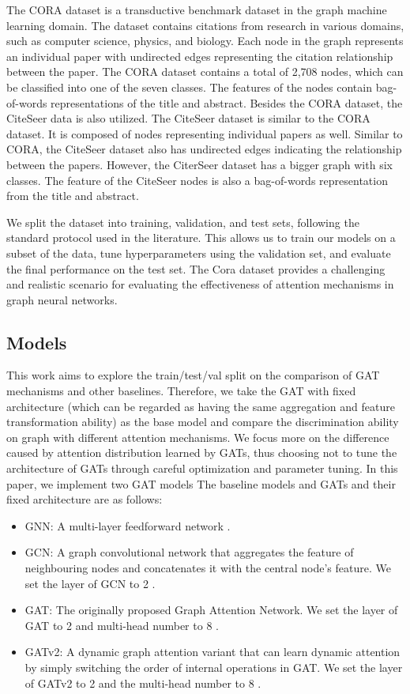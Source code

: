 \documentclass[runningheads]{llncs}
\begin{document}
The CORA dataset is a transductive benchmark dataset in the graph machine learning domain. 
The dataset contains citations from research in various domains, such as computer science, physics, and biology. Each node in the graph represents an individual paper with undirected edges representing the citation relationship between the paper. 
The CORA dataset contains a total of 2,708 nodes, which can be classified into one of the seven classes. The features of the nodes contain bag-of-words representations of the title and abstract. Besides the CORA dataset, the CiteSeer data is also utilized.  The CiteSeer dataset is similar to the CORA dataset. It is composed of nodes representing individual papers as well. Similar to CORA, the CiteSeer dataset also has undirected edges indicating the relationship between the papers. However, the CiterSeer dataset has a  bigger graph with six classes. The feature of the CiteSeer nodes is also a bag-of-words representation from the title and abstract. 


We split the dataset into training, validation, and test sets, following the standard protocol used in the literature. This allows us to train our models on a subset of the data, tune hyperparameters using the validation set, and evaluate the final performance on the test set. The Cora dataset provides a challenging and realistic scenario for evaluating the effectiveness of attention mechanisms in graph neural networks. 

\subsection{Models}
This work aims to explore the train/test/val split on the comparison of GAT mechanisms and other baselines. Therefore, we take the GAT with fixed architecture (which can be regarded as having the same aggregation and feature transformation ability) as the base model and compare the discrimination ability on graph with different attention mechanisms. We focus more on the difference caused by attention distribution learned by GATs, thus choosing not to tune the architecture of GATs through careful optimization and parameter tuning. In this paper, we implement two GAT models
The baseline models and GATs and their fixed architecture are as follows:

\begin{itemize}
    \item GNN: A multi-layer feedforward network \cite{Allessio2009}. 
    \item GCN: A  graph convolutional network that aggregates the feature of neighbouring nodes and
concatenates it with the central node’s feature. We set the layer of GCN to 2 \cite{Kipf2016}.
    \item GAT: The originally proposed Graph Attention Network. We set the layer of GAT to 2 and multi-head
number to 8 \cite{veličković2018graph}.
    \item GATv2: A dynamic graph attention variant that can learn dynamic attention by simply switching the order
of internal operations in GAT. We set the layer of GATv2 to 2 and the multi-head number to 8 \cite{Brody2021}.
\end{itemize}
\end{document}
